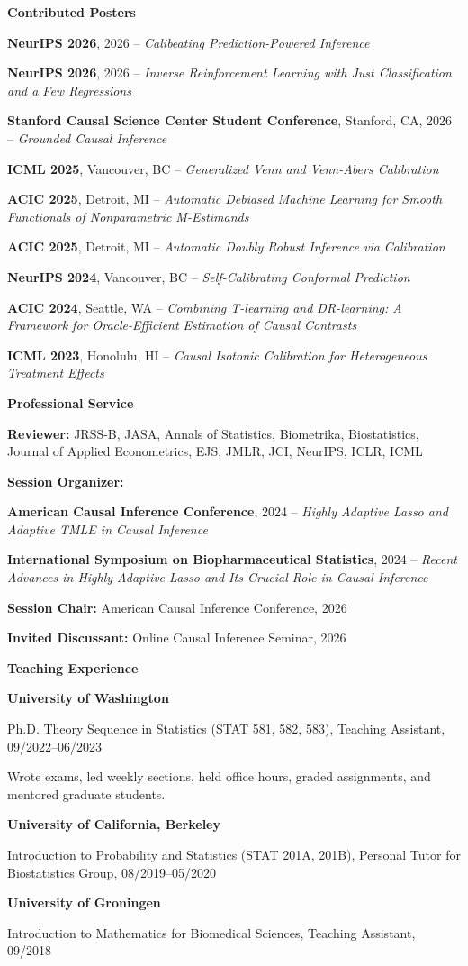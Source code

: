 \documentclass[10pt,letterpaper]{article}
\newcommand{\cvsection}[1]{%
  \vspace{0.55em}%
  {\Large\bfseries #1}\par
  \vspace{0.20em}%
}
\newcommand{\cvsubsection}[1]{%
  \vspace{0.35em}%
  {\large\bfseries #1}\par
  \vspace{0.12em}%
}
\newcommand{\talk}[3]{%
  \textbf{#1}, #2 -- \emph{#3}\par
}
\begin{document}
{\cvsubsection{Contributed Posters}
\talk{NeurIPS 2026}{2026}{Calibeating Prediction-Powered Inference}
\talk{NeurIPS 2026}{2026}{Inverse Reinforcement Learning with Just Classification and a Few Regressions}
\talk{Stanford Causal Science Center Student Conference}{Stanford, CA, 2026}{Grounded Causal Inference}
\talk{ICML 2025}{Vancouver, BC}{Generalized Venn and Venn-Abers Calibration}
\talk{ACIC 2025}{Detroit, MI}{Automatic Debiased Machine Learning for Smooth Functionals of Nonparametric M-Estimands}
\talk{ACIC 2025}{Detroit, MI}{Automatic Doubly Robust Inference via Calibration}
\talk{NeurIPS 2024}{Vancouver, BC}{Self-Calibrating Conformal Prediction}
\talk{ACIC 2024}{Seattle, WA}{Combining T-learning and DR-learning: A Framework for Oracle-Efficient Estimation of Causal Contrasts}
\talk{ICML 2023}{Honolulu, HI}{Causal Isotonic Calibration for Heterogeneous Treatment Effects}

\cvsection{Professional Service}
\textbf{Reviewer:} JRSS-B, JASA, Annals of Statistics, Biometrika, Biostatistics, Journal of Applied Econometrics, EJS, JMLR, JCI, NeurIPS, ICLR, ICML

\vspace{0.45em}
\textbf{Session Organizer:}\par
\textbf{American Causal Inference Conference}, 2024 -- \emph{Highly Adaptive Lasso and Adaptive TMLE in Causal Inference}\par
\textbf{International Symposium on Biopharmaceutical Statistics}, 2024 -- \emph{Recent Advances in Highly Adaptive Lasso and Its Crucial Role in Causal Inference}

\vspace{0.45em}
\textbf{Session Chair:} American Causal Inference Conference, 2026

\vspace{0.45em}
\textbf{Invited Discussant:} Online Causal Inference Seminar, 2026

\cvsection{Teaching Experience}
\textbf{University of Washington}\par
Ph.D. Theory Sequence in Statistics (STAT 581, 582, 583), Teaching Assistant, 09/2022--06/2023\par
Wrote exams, led weekly sections, held office hours, graded assignments, and mentored graduate students.

\vspace{0.45em}
\textbf{University of California, Berkeley}\par
Introduction to Probability and Statistics (STAT 201A, 201B), Personal Tutor for Biostatistics Group, 08/2019--05/2020

\vspace{0.45em}
\textbf{University of Groningen}\par
Introduction to Mathematics for Biomedical Sciences, Teaching Assistant, 09/2018
}
\end{document}
